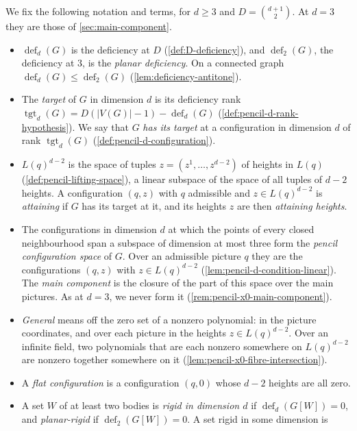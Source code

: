 We fix the following notation and terms, for $d \ge 3$ and
$D = \binom{d+1}{2}$. At $d = 3$ they are those of
\cref{sec:main-component}.
\begin{itemize}
  \item $\operatorname{def}_d(G)$ is the deficiency at $D$
    (\cref{def:D-deficiency}), and $\operatorname{def}_2(G)$, the
    deficiency at $3$, is the \emph{planar deficiency}. On a connected
    graph $\operatorname{def}_d(G) \le \operatorname{def}_2(G)$
    (\cref{lem:deficiency-antitone}).
  \item The \emph{target} of $G$ in dimension $d$ is its deficiency rank
    $\operatorname{tgt}_d(G) = D(|V(G)| - 1) - \operatorname{def}_d(G)$
    (\cref{def:pencil-d-rank-hypothesis}). We say that $G$ \emph{has its
    target} at a configuration in dimension $d$ of rank
    $\operatorname{tgt}_d(G)$ (\cref{def:pencil-d-configuration}).
  \item $L(q)^{d-2}$ is the space of tuples $z = (z^1, \dots, z^{d-2})$
    of heights in $L(q)$ (\cref{def:pencil-lifting-space}), a linear
    subspace of the space of all tuples of $d - 2$ heights. A
    configuration $(q, z)$ with $q$ admissible and $z \in L(q)^{d-2}$ is
    \emph{attaining} if $G$ has its target at it, and its heights $z$
    are then \emph{attaining heights}.
  \item The configurations in dimension $d$ at which the points of every
    closed neighbourhood span a subspace of dimension at most three form
    the \emph{pencil configuration space} of $G$. Over an admissible
    picture $q$ they are the configurations $(q, z)$ with
    $z \in L(q)^{d-2}$ (\cref{lem:pencil-d-condition-linear}). The
    \emph{main component} is the closure of the part of this space over
    the main pictures. As at $d = 3$, we never form it
    (\cref{rem:pencil-x0-main-component}).
  \item \emph{General} means off the zero set of a nonzero polynomial: in
    the picture coordinates, and over each picture in the heights
    $z \in L(q)^{d-2}$. Over an infinite field, two polynomials that are
    each nonzero somewhere on $L(q)^{d-2}$ are nonzero together somewhere
    on it (\cref{lem:pencil-x0-fibre-intersection}).
  \item A \emph{flat configuration} is a configuration $(q, 0)$ whose
    $d - 2$ heights are all zero.
  \item A set $W$ of at least two bodies is \emph{rigid in dimension $d$}
    if $\operatorname{def}_d(G[W]) = 0$, and \emph{planar-rigid} if
    $\operatorname{def}_2(G[W]) = 0$. A set rigid in some dimension is

\end{itemize}
